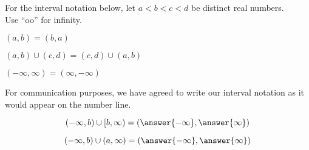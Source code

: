 \documentclass{ximera}
\author{Lee Wayand}
\begin{document}
For the interval notation below, let $a < b < c < d$ be distinct real numbers. \\

Use ``oo'' for infinity. \\


\begin{question}

$(a, b) = (b, a)$ 

\begin{multipleChoice}
\end{multipleChoice}

\end{question}




\begin{question}

$(a, b) \cup (c, d) = (c, d) \cup (a, b)$

\begin{multipleChoice}
\end{multipleChoice}

\end{question}





\begin{question}

$(-\infty, \infty) = (\infty, -\infty)$

\begin{multipleChoice}
\end{multipleChoice}
\begin{feedback}[correct]
For communication purposes, we have agreed to write our interval notation as it would appear on the number line.
\end{feedback}
\end{question}






\begin{question}
\[
(-\infty, b) \cup [b, \infty) = \left( \answer{-\infty}, \answer{\infty} \right)
\]
\end{question}







\begin{question}
\[
(-\infty, b) \cup (a, \infty) = \left( \answer{-\infty}, \answer{\infty} \right)
\]
\end{question}
\end{document}
